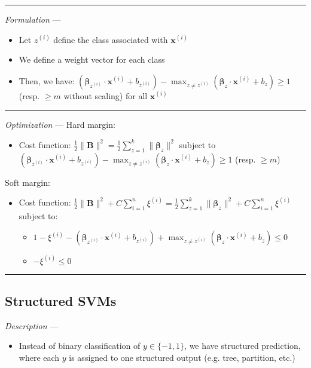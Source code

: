 {\color{lightgray}\hrule height 0.001mm}

\emph{Formulation} --- 
\begin{itemize}
    \item Let $z^{(i)}$ define the class associated with $ \boldsymbol{x}^{(i)}$
    \item We define a weight vector for each class
    \item Then, we have:
    $(\boldsymbol{\beta}_{z^{(i)}} \cdot \boldsymbol{x}^{(i)} + b_{z^{(i)}}) - \max_{z \neq z^{(i)}} (\boldsymbol{\beta}_{z} \cdot \boldsymbol{x}^{(i)} + b_{z}) \geq 1$ (resp. $\geq m$ without scaling) for all $\boldsymbol{x}^{(i)}$
\end{itemize}

{\color{lightgray}\hrule height 0.001mm}

\emph{Optimization} ---
Hard margin:
\begin{itemize}
    \item Cost function: $\frac{1}{2} \| \boldsymbol{B} \|^2 = \frac{1}{2} \sum_{z=1}^k \| \boldsymbol{\beta}_z \|^2 $ subject to $(\boldsymbol{\beta}_{z^{(i)}} \cdot \boldsymbol{x}^{(i)} + b_{z^{(i)}}) - \max_{z \neq z^{(i)}} (\boldsymbol{\beta}_{z} \cdot \boldsymbol{x}^{(i)} + b_{z}) \geq 1$ (resp. $\geq m$) 
\end{itemize}
Soft margin:
\begin{itemize}
    \item Cost function: $\frac{1}{2} \| \boldsymbol{B} \|^2 + C \sum_{i=1}^n \xi^{(i)} = \frac{1}{2} \sum_{z=1}^k \| \boldsymbol{\beta}_z \|^2 + C \sum_{i=1}^n \xi^{(i)}$ subject to:
    \begin{itemize}
        \item $1-\xi^{(i)} - (\boldsymbol{\beta}_{z^{(i)}} \cdot \boldsymbol{x}^{(i)} + b_{z^{(i)}}) + \max_{z \neq z^{(i)}} (\boldsymbol{\beta}_{z} \cdot \boldsymbol{x}^{(i)} + b_{z}) \leq 0$ 
        \item $-\xi^{(i)} \leq 0$
    \end{itemize}
\end{itemize}

{\color{black}\hrule height 0.001mm}

\subsection*{Structured SVMs}
\emph{Description} --- 
\begin{itemize}
    \item Instead of binary classification of $y \in \{-1,1\}$, we have structured prediction, where each $y$ is assigned to one structured output (e.g. tree, partition, etc.)
\end{itemize}


